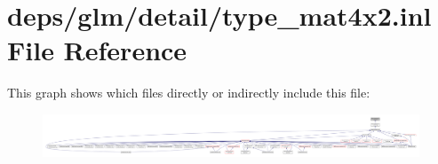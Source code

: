 \hypertarget{type__mat4x2_8inl}{}\section{deps/glm/detail/type\+\_\+mat4x2.inl File Reference}
\label{type__mat4x2_8inl}
This graph shows which files directly or indirectly include this file\+:
\nopagebreak
\begin{figure}[H]
\begin{center}
\leavevmode
\includegraphics[width=350pt]{d8/d44/type__mat4x2_8inl__dep__incl}
\end{center}
\end{figure}
